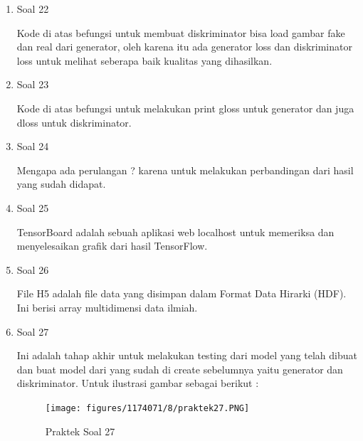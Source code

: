 \begin{enumerate}
	\item Soal 22
	\hfill\break
	
	Kode di atas befungsi untuk membuat diskriminator bisa load gambar fake dan real dari generator, oleh karena itu ada generator loss dan diskriminator loss untuk melihat seberapa baik kualitas yang dihasilkan.

	\item Soal 23
	\hfill\break
	
	Kode di atas befungsi untuk melakukan print gloss untuk generator dan juga dloss untuk diskriminator.

	\item Soal 24
	\hfill\break
	
	Mengapa ada perulangan ? karena untuk melakukan perbandingan dari hasil yang sudah didapat.

	\item Soal 25
	\hfill\break
	
	TensorBoard adalah sebuah aplikasi web localhost untuk memeriksa dan menyelesaikan grafik dari hasil TensorFlow.

	\item Soal 26
	\hfill\break
	
	File H5 adalah file data yang disimpan dalam Format Data Hirarki (HDF). Ini berisi array multidimensi data ilmiah.

	\item Soal 27
	\hfill\break
	
	Ini adalah tahap akhir untuk melakukan testing dari model yang telah dibuat dan buat model dari yang sudah di create sebelumnya yaitu generator dan diskriminator. Untuk ilustrasi gambar sebagai berikut : 

	\begin{figure}[H]
	\centering
		\texttt{[image: figures/1174071/8/praktek27.PNG]}
		\caption{Praktek Soal 27}
	\end{figure}
\end{enumerate}

